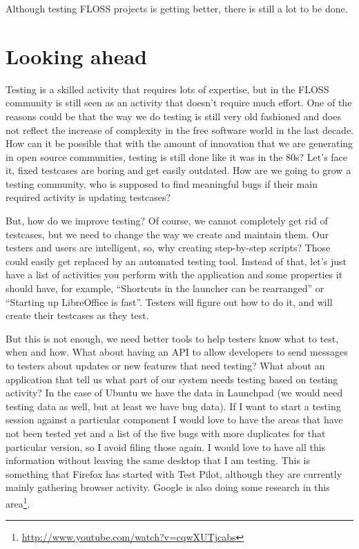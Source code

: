 Although testing FLOSS projects is getting better, there is still a lot to be done.

\section*{Looking ahead}

Testing is a skilled activity that requires lots of expertise, but in the FLOSS community is still seen as an activity that doesn't require much effort. One of the reasons could be that the way we do testing is still very old fashioned and does not reflect the increase of complexity in the free software world in the last decade. How can it be possible that with the amount of innovation that we are generating in open source communities, testing is still done like it was in the 80s? Let's face it, fixed testcases are boring and get easily outdated. How are we going to grow a testing community, who is supposed to find meaningful bugs if their main required activity is updating testcases?

But, how do we improve testing? Of course, we cannot completely get rid of testcases, but we need to change the way we create and maintain them. Our testers and users are intelligent, so, why creating step-by-step scripts? Those could easily get replaced by an automated testing tool. Instead of that, let's just have a list of activities you perform with the application and some properties it should have, for example, ``Shortcuts in the launcher can be rearranged'' or ``Starting up LibreOffice is fast''. Testers will figure out how to do it, and will create their testcases as they test.

But this is not enough, we need better tools to help testers know what to test, when and how.  What about having an API to allow developers to send messages to testers about updates or new features that need testing? What about an application that tell us what part of our system needs testing based on testing activity? In the case of Ubuntu we have the data in Launchpad (we would need testing data as well, but at least we have bug data). If I want to start a testing session against a particular component I would love to have the areas that have not been tested yet and a list of the five bugs with more duplicates for that particular version, so I avoid filing those again. I would love to have all this information without leaving the same desktop that I am testing. This is something that Firefox has started with Test Pilot, although they are currently mainly gathering browser activity. Google is also doing some research in this area\footnote{\url{http://www.youtube.com/watch?v=cqwXUTjcabs}}.

